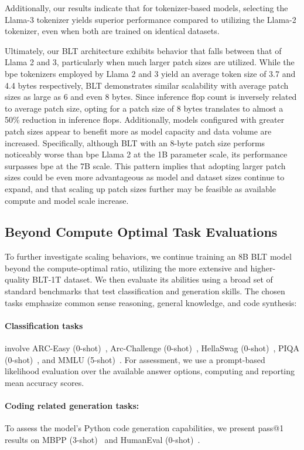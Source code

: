 Additionally, our results indicate that for tokenizer-based models, selecting the Llama-3 tokenizer yields superior performance compared to utilizing the Llama-2 tokenizer, even when both are trained on identical datasets.

Ultimately, our {\textsc BLT} architecture exhibits behavior that falls between that of Llama 2 and 3, particularly when much larger patch sizes are utilized. While the bpe tokenizers employed by Llama 2 and 3 yield an average token size of 3.7 and 4.4 bytes respectively, {\textsc BLT} demonstrates similar scalability with average patch sizes as large as 6 and even 8 bytes. Since inference flop count is inversely related to average patch size, opting for a patch size of 8 bytes translates to almost a 50\% reduction in inference flops. Additionally, models configured with greater patch sizes appear to benefit more as model capacity and data volume are increased. Specifically, although {\textsc BLT} with an 8-byte patch size performs noticeably worse than bpe Llama 2 at the 1B parameter scale, its performance surpasses bpe at the 7B scale. This pattern implies that adopting larger patch sizes could be even more advantageous as model and dataset sizes continue to expand, and that scaling up patch sizes further may be feasible as available compute and model scale increase.

\subsection{Beyond Compute Optimal Task Evaluations}
\label{section:evals}
To further investigate scaling behaviors, we continue training an 8B {\textsc BLT} model beyond the compute-optimal ratio, utilizing the more extensive and higher-quality {\textsc BLT}-1T dataset. We then evaluate its abilities using a broad set of standard benchmarks that test classification and generation skills. The chosen tasks emphasize common sense reasoning, general knowledge, and code synthesis:
\paragraph{Classification tasks} involve ARC-Easy (0-shot)~\citep{Eval_ARC}, Arc-Challenge (0-shot)~\citep{Eval_ARC}, HellaSwag (0-shot)~\citep{Eval_hellaswag}, PIQA (0-shot)~\citep{Eval_piqa}, and MMLU (5-shot)~\citep{hendrycks2020measuring}. For assessment, we use a prompt-based likelihood evaluation over the available answer options, computing and reporting mean accuracy scores.
\paragraph{Coding related generation tasks:}  To assess the model's Python code generation capabilities, we present pass@1 results on MBPP (3-shot)~\citep{Eval_MBPP} and HumanEval (0-shot)~\citep{Eval_HumanEval}.

